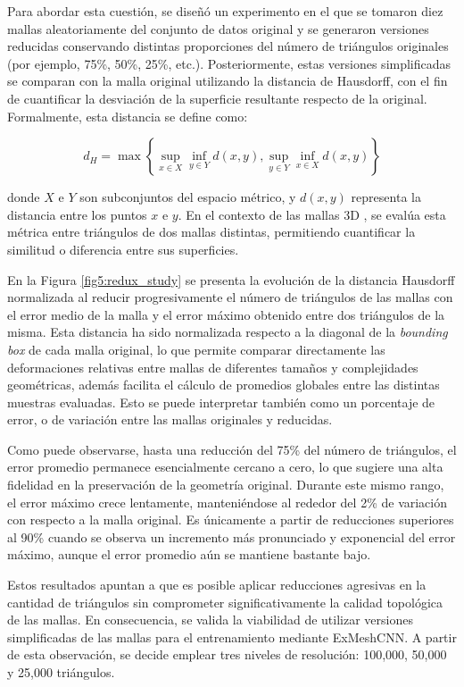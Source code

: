 Para abordar esta cuestión, se diseñó un experimento en el que se tomaron diez mallas aleatoriamente del conjunto de datos original y se generaron versiones reducidas conservando distintas proporciones del número de triángulos originales (por ejemplo, 75\%, 50\%, 25\%, etc.). Posteriormente, estas versiones simplificadas se comparan con la malla original utilizando la distancia de Hausdorff, con el fin de cuantificar la desviación de la superficie resultante respecto de la original. Formalmente, esta distancia se define como:

\begin{equation}
d_H = \max\left\{\sup_{x\in X} \inf_{y \in Y} d(x,y), \sup_{y\in Y} \inf_{x \in X} d(x,y) \right\}
\end{equation}

donde $X$ e $Y$ son subconjuntos del espacio métrico, y $d(x,y)$ representa la distancia entre los puntos $x$ e $y$. En el contexto de las mallas 3D \cite{cignoni1998metro}, se evalúa esta métrica entre triángulos de dos mallas distintas, permitiendo cuantificar la similitud o diferencia entre sus superficies.

En la Figura \ref{fig5:redux_study} se presenta la evolución de la distancia Hausdorff normalizada al reducir progresivamente el número de triángulos de las mallas con el error medio de la malla y el error máximo obtenido entre dos triángulos de la misma. Esta distancia ha sido normalizada respecto a la diagonal de la \textit{bounding box} de cada malla original, lo que permite comparar directamente las deformaciones relativas entre mallas de diferentes tamaños y complejidades geométricas, además facilita el cálculo de promedios globales entre las distintas muestras evaluadas. Esto se puede interpretar también como un porcentaje de error, o de variación entre las mallas originales y reducidas.

Como puede observarse, hasta una reducción del 75\% del número de triángulos, el error promedio permanece esencialmente cercano a cero, lo que sugiere una alta fidelidad en la preservación de la geometría original. Durante este mismo rango, el error máximo crece lentamente, manteniéndose al rededor del 2\% de variación con respecto a la malla original. Es únicamente a partir de reducciones superiores al 90\% cuando se observa un incremento más pronunciado y exponencial del error máximo, aunque el error promedio aún se mantiene bastante bajo.

Estos resultados apuntan a que es posible aplicar reducciones agresivas en la cantidad de triángulos sin comprometer significativamente la calidad topológica de las mallas. En consecuencia, se valida la viabilidad de utilizar versiones simplificadas de las mallas para el entrenamiento mediante ExMeshCNN. A partir de esta observación, se decide emplear tres niveles de resolución: 100,000, 50,000 y 25,000 triángulos.

